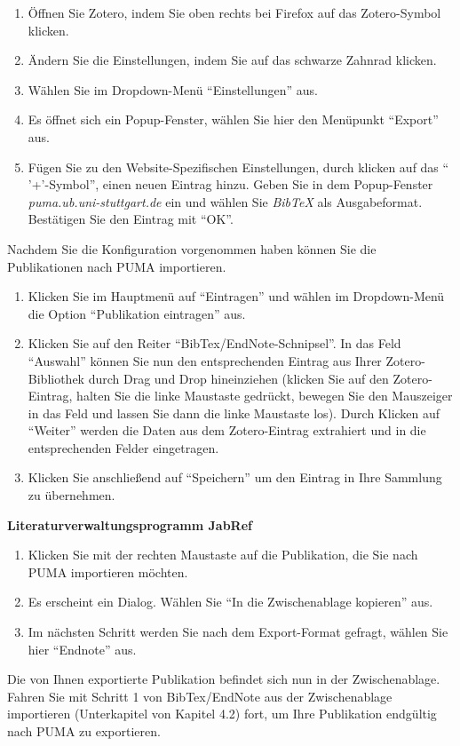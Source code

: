 \documentclass[b5paper,11pt,twoside]{scrbook} %
\begin{document}
\begin{enumerate}
    \item Öffnen Sie Zotero, indem Sie oben rechts bei Firefox auf das Zotero-Symbol klicken.
    \item Ändern Sie die Einstellungen, indem Sie auf das schwarze Zahnrad klicken. 
    \item Wählen Sie im Dropdown-Menü \enquote{Einstellungen} aus.
    \item Es öffnet sich ein Popup-Fenster, wählen Sie hier den Menüpunkt \enquote{Export} aus. 
    \item Fügen Sie zu den Website-Spezifischen Einstellungen, durch klicken auf das \enquote{ '+'-Symbol}, einen neuen Eintrag hinzu. Geben Sie in dem Popup-Fenster \textit{puma.ub.uni-stuttgart.de} ein und wählen Sie \textit{BibTeX} als Ausgabeformat. Bestätigen Sie den Eintrag mit \enquote{OK}. 
\end{enumerate}
Nachdem Sie die Konfiguration vorgenommen haben können Sie die Publikationen nach PUMA importieren. 
\begin{enumerate}
    \item Klicken Sie im Hauptmenü auf \enquote{Eintragen} und wählen im Dropdown-Menü die Option \enquote{Publikation eintragen} aus.  
    \item Klicken Sie auf den Reiter \enquote{BibTex/EndNote-Schnipsel}. In das Feld \enquote{Auswahl} können Sie nun den entsprechenden Eintrag aus Ihrer Zotero-Bibliothek durch Drag und Drop hineinziehen (klicken Sie auf den Zotero-Eintrag, halten Sie die linke Maustaste gedrückt, bewegen Sie den Mauszeiger in das Feld und lassen Sie dann die linke Maustaste los). Durch Klicken auf \enquote{Weiter} werden die Daten aus dem Zotero-Eintrag extrahiert und in die entsprechenden Felder eingetragen. 
    \item Klicken Sie anschließend auf \enquote{Speichern} um den Eintrag in Ihre Sammlung zu übernehmen.
\end{enumerate}  
\textbf{Literaturverwaltungsprogramm JabRef}
\begin{enumerate}
    \item Klicken Sie mit der rechten Maustaste auf die Publikation, die Sie nach PUMA importieren möchten.
    \item Es erscheint ein Dialog. Wählen Sie \enquote{In die Zwischenablage kopieren} aus.
    \item Im nächsten Schritt werden Sie nach dem Export-Format gefragt, wählen Sie hier \enquote{Endnote} aus.
\end{enumerate}
Die von Ihnen exportierte Publikation befindet sich nun in der Zwischenablage. Fahren Sie mit Schritt 1 von BibTex/EndNote aus der Zwischenablage importieren (Unterkapitel von Kapitel 4.2) fort, um Ihre Publikation endgültig nach PUMA zu exportieren.
\end{document}
